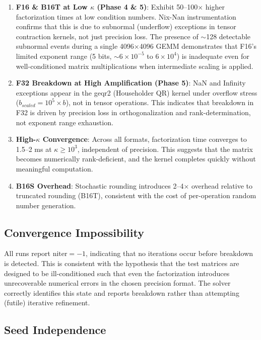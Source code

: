 \documentclass[11pt,a4paper]{article}
\begin{document}
\begin{enumerate}
  \item \textbf{F16 \& B16T at Low $\kappa$ (Phase 4 \& 5)}: Exhibit 50--100$\times$ higher factorization times at low condition numbers. Nix-Nan instrumentation confirms that this is due to subnormal (underflow) exceptions in tensor contraction kernels, not just precision loss. The presence of $\sim$128 detectable subnormal events during a single 4096$\times$4096 GEMM demonstrates that F16's limited exponent range (5 bits, $\sim 6 \times 10^{-5}$ to $6 \times 10^4$) is inadequate even for well-conditioned matrix multiplications when intermediate scaling is applied.

  \item \textbf{F32 Breakdown at High Amplification (Phase 5)}: NaN and Infinity exceptions appear in the geqr2 (Householder QR) kernel under overflow stress ($b_{scaled} = 10^5 \times b$), not in tensor operations. This indicates that breakdown in F32 is driven by precision loss in orthogonalization and rank-determination, not exponent range exhaustion.

  \item \textbf{High-$\kappa$ Convergence}: Across all formats, factorization time converges to 1.5--2 ms at $\kappa \geq 10^3$, independent of precision. This suggests that the matrix becomes numerically rank-deficient, and the kernel completes quickly without meaningful computation.

  \item \textbf{B16S Overhead}: Stochastic rounding introduces 2--4$\times$ overhead relative to truncated rounding (B16T), consistent with the cost of per-operation random number generation.
\end{enumerate}

\subsection{Convergence Impossibility}

All runs report $\text{niter}=-1$, indicating that no iterations occur before breakdown is detected. This is consistent with the hypothesis that the test matrices are designed to be ill-conditioned such that even the factorization introduces unrecoverable numerical errors in the chosen precision format. The solver correctly identifies this state and reports breakdown rather than attempting (futile) iterative refinement.

\subsection{Seed Independence}
\end{document}
